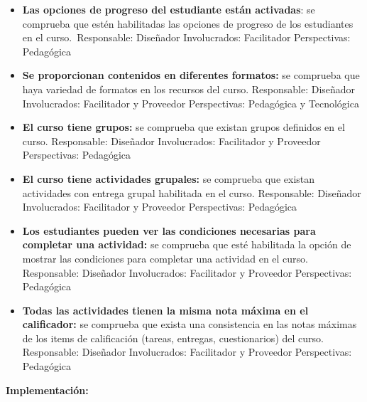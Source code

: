 \begin{itemize}
	\item
	\textbf{Las opciones de progreso del estudiante están activadas}: se
	comprueba que estén habilitadas las opciones de progreso de los
	estudiantes en el curso.~{Responsable:} Diseñador
	{Involucrados:} Facilitador {Perspectivas:} Pedagógica
	\item
	\textbf{Se proporcionan contenidos en diferentes formatos:} se
	comprueba que haya variedad de formatos en los recursos del curso.
	{Responsable:} Diseñador {Involucrados:} Facilitador y
	Proveedor {Perspectivas:} Pedagógica y Tecnológica
	\item
	\textbf{El curso tiene grupos:} se comprueba que existan grupos
	definidos en el curso. {Responsable:} Diseñador
	{Involucrados:} Facilitador y Proveedor {Perspectivas:}
	Pedagógica
	\item
	\textbf{El curso tiene actividades grupales:} se comprueba que existan
	actividades con entrega grupal habilitada en el curso.
	{Responsable:} Diseñador {Involucrados:} Facilitador y
	Proveedor {Perspectivas:} Pedagógica
	\item
	\textbf{Los estudiantes pueden ver las condiciones necesarias para
		completar una actividad:} se comprueba que esté habilitada la opción
	de mostrar las condiciones para completar una actividad en el curso.
	{Responsable:} Diseñador {Involucrados:} Facilitador y
	Proveedor {Perspectivas:} Pedagógica
	\item
	\textbf{Todas las actividades tienen la misma nota máxima en el
		calificador:} se comprueba que exista una consistencia en las notas
	máximas de los items de calificación (tareas, entregas, cuestionarios)
	del curso. {Responsable:} Diseñador {Involucrados:}
	Facilitador y Proveedor {Perspectivas:} Pedagógica
\end{itemize}

\textbf{Implementación:}

